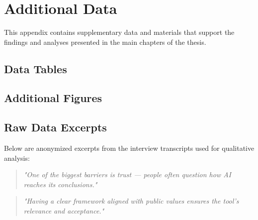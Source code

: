 
\chapter{Additional Data}

This appendix contains supplementary data and materials that support the findings and analyses presented in the main chapters of the thesis.

\section*{Data Tables}



\vspace{2em}

\section*{Additional Figures}



\vspace{2em}

\section*{Raw Data Excerpts}

\noindent Below are anonymized excerpts from the interview transcripts used for qualitative analysis:

\begin{quote}
    \textit{"One of the biggest barriers is trust — people often question how AI reaches its conclusions."}
\end{quote}

\begin{quote}
    \textit{"Having a clear framework aligned with public values ensures the tool's relevance and acceptance."}
\end{quote}

\vspace{2em}

